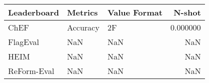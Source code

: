 \begin{tabular}{lllr}
\toprule
Leaderboard & Metrics & Value Format & N-shot \\
\midrule
ChEF & Accuracy & 2F & 0.000000 \\
FlagEval & NaN & NaN & NaN \\
HEIM & NaN & NaN & NaN \\
ReForm-Eval & NaN & NaN & NaN \\
\bottomrule
\end{tabular}
